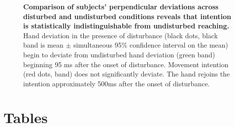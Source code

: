 \documentclass[10pt]{article}
\begin{document}
\begin{figure}[!ht]
\begin{center}
\end{center}
\caption{
{\bf Comparison of subjects' perpendicular deviations across disturbed and undisturbed conditions reveals that intention is statistically indistinguishable from undisturbed reaching.} Hand deviation in the presence of disturbance (black dots, black band is mean $\pm$ simultaneous 95\% confidence interval on the mean) begin to deviate from undisturbed hand deviation (green band) beginning 95 ms after the onset of disturbance. Movement intention (red dots, band) does not significantly deviate. The hand rejoins the intention approximately 500ms after the onset of disturbance.
}
\label{fig:grouptrends}
\end{figure}

\section*{Tables}
\end{document}
